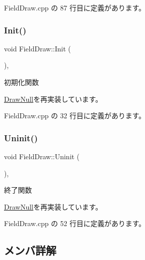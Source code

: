  Field\+Draw.\+cpp の 87 行目に定義があります。

\mbox{\label{class_field_draw_a4287d2ce33033b2413c1d3a81b173373}} 
\subsubsection{\texorpdfstring{Init()}{Init()}}
{\footnotesize\ttfamily void Field\+Draw\+::\+Init (\begin{DoxyParamCaption}{ }\end{DoxyParamCaption})\hspace{0.3cm}{\ttfamily [override]}, {\ttfamily [virtual]}}



初期化関数 



\mbox{\hyperlink{class_draw_null_acd7fef3ccea1da537ac9507ffbb6dd2e}{Draw\+Null}}を再実装しています。



 Field\+Draw.\+cpp の 32 行目に定義があります。

\mbox{\label{class_field_draw_a89a78212c141714d9e39e25e663aaeff}} 
\subsubsection{\texorpdfstring{Uninit()}{Uninit()}}
{\footnotesize\ttfamily void Field\+Draw\+::\+Uninit (\begin{DoxyParamCaption}{ }\end{DoxyParamCaption})\hspace{0.3cm}{\ttfamily [override]}, {\ttfamily [virtual]}}



終了関数 



\mbox{\hyperlink{class_draw_null_a12d44e341c7364b5ab9cdd661dc16187}{Draw\+Null}}を再実装しています。



 Field\+Draw.\+cpp の 52 行目に定義があります。



\subsection{メンバ詳解}
\mbox{\label{class_field_draw_a1d9e36a7e8d6dd8791d2dd82bceac28f}} 
